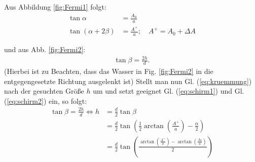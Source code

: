 \documentclass[11pt,a4paper,titlepage, ngerman]{article}
\newcommand{\refeq}[1]{Gl. (\ref{eq:#1})}
\newcommand{\reffig}[1]{Fig. \ref{fig:#1}}
\begin{document}
		Aus Abbildung \ref{fig:Fermi1} folgt:
		\begin{align}
			\tan \alpha &= \frac{A_0}{a}
			\label{eq:schirm1}\\
			\tan (\alpha + 2 \beta) &= \frac{A^+}{a};\quad A^+ = A_0+\Delta A
			\label{eq:schirm2}
		\end{align}
		
		und aus Abb. \ref{fig:Fermi2}: 
			\begin{align}
			\tan \beta = \frac{2 h}{d}.
			\label{eq:kruemmung}
		\end{align}
		(Hierbei ist zu Beachten, dass das Wasser in \reffig{Fermi2} in die entgegengesetzte Richtung ausgelenkt ist)										
		Stellt man nun \refeq{kruemmung} nach der gesuchten Größe $h$ um und setzt geeignet \refeq{schirm1} und \refeq{schirm2} ein, so folgt:	
		\begin{align}
			\tan \beta = \frac{2h}{d} \Leftrightarrow h &= \frac{d}{2} \tan \beta\\
			&= \frac{d}{2} \tan \left( \frac{1}{2}\arctan \left( \frac{A^+}{a}\right) - \frac{\alpha}{2}\right)\\
			&= \frac{d}{2} \tan \left( \frac{\arctan \left( \frac{A^+}{a}\right) - \arctan\left( \frac{A_0}{a}\right)}{2} \right) \label{eq:auslenkung}
		\end{align}
		
\end{document}
